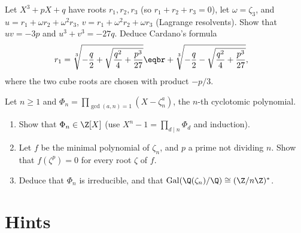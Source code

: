 \begin{exercise}[$\star\star$]\label{ex:cardano}
Let $X^3+pX+q$ have roots $r_1,r_2,r_3$ (so $r_1+r_2+r_3=0$), let $\omega=\zeta_3$, and $u=r_1+\omega r_2+\omega^2r_3$, $v=r_1+\omega^2r_2+\omega r_3$ (Lagrange resolvents). Show that $uv=-3p$ and $u^3+v^3=-27q$. Deduce Cardano's formula
\[
\begin{aligned}r_1&=\sqrt[3]{-\frac q2+\sqrt{\frac{q^2}4+\frac{p^3}{27}}}\eqbr+\sqrt[3]{-\frac q2-\sqrt{\frac{q^2}4+\frac{p^3}{27}}},\end{aligned}
\]
where the two cube roots are chosen with product $-p/3$.
\end{exercise}

\begin{exercise}[$\star\star\star$]\label{ex:phin}
Let $n\ge1$ and $\Phi_n=\prod_{\gcd(a,n)=1}(X-\zeta_n^a)$, the $n$-th cyclotomic polynomial.
\begin{enumerate}[label=(\alph*)]
\item Show that $\Phi_n\in\Z[X]$ (use $X^n-1=\prod_{d\mid n}\Phi_d$ and induction).
\item Let $f$ be the minimal polynomial of $\zeta_n$, and $p$ a prime not dividing $n$. Show that $f(\zeta^p)=0$ for every root $\zeta$ of $f$.
\item Deduce that $\Phi_n$ is irreducible, and that $\operatorname{Gal}(\Q(\zeta_n)/\Q)\cong(\Z/n\Z)^*$.
\end{enumerate}
\end{exercise}

\section{Hints}

